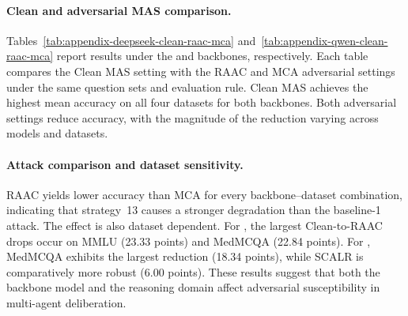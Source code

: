\paragraph{Clean and adversarial MAS comparison.}
Tables~\ref{tab:appendix-deepseek-clean-raac-mca}
and~\ref{tab:appendix-qwen-clean-raac-mca} report results under the
\DeepSeekModelName{} and \QwenModelName{} backbones, respectively. Each table
compares the Clean MAS setting with the RAAC and MCA adversarial settings
under the same question sets and evaluation rule. Clean MAS achieves the
highest mean accuracy on all four datasets for both backbones. Both
adversarial settings reduce accuracy, with the magnitude of the reduction
varying across models and datasets.

\paragraph{Attack comparison and dataset sensitivity.}
RAAC yields lower accuracy than MCA for every backbone--dataset combination,
indicating that strategy~13 causes a stronger degradation than the baseline-1
attack. The effect is also dataset dependent. For \DeepSeekModelName{}, the
largest Clean-to-RAAC drops occur on MMLU (23.33 points) and MedMCQA
(22.84 points). For \QwenModelName{}, MedMCQA exhibits the largest reduction
(18.34 points), while SCALR is comparatively more robust (6.00 points).
These results suggest that both the backbone model and the reasoning domain
affect adversarial susceptibility in multi-agent deliberation.
